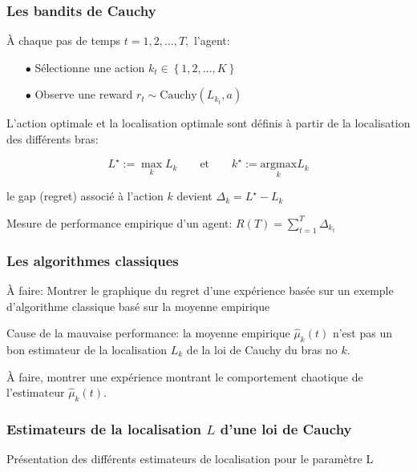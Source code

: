 \documentclass[8pt, sans]{beamer}
\begin{document}
\begin{frame}

\frametitle{Les bandits de Cauchy}

À chaque pas de temps $t=1,2,\ldots,T,$ l'agent:

\begin{itemize}

\item[$\bullet$] Sélectionne une action $k_t\in\left\{1,2,\ldots,K\right\}$

\item[$\bullet$] Observe une reward $r_t\sim \mathrm{Cauchy}(L_{k_t},a)$

\end{itemize}

\vfill
\pause

L'action optimale et la localisation optimale sont définis à partir de la localisation des différents bras:

\pause
$$\displaystyle L^{\star} := \max_k L_k \qquad \text{et} \qquad k^{\star} := \underset{k}{\mathrm{argmax}} L_k$$ 

\pause
\vfill

le gap (regret) associé à l'action $k$ devient $\Delta_k= L^{\star}-L_k$ 

\pause
\vfill

Mesure de performance empirique d'un agent: $\displaystyle R(T)=\sum_{t=1}^T \Delta_{k_t}$

\end{frame}

\begin{frame}
\frametitle{Les algorithmes classiques}

À faire: Montrer le graphique du regret d'une expérience basée sur un exemple d'algorithme classique basé sur la moyenne empirique 
\vfill
\pause

Cause de la mauvaise performance: la moyenne empirique $\hat \mu_k(t)$ n'est pas un bon estimateur de la localisation $L_k$ de la loi de Cauchy du bras no $k.$\\

\vfill
\pause

À faire, montrer une expérience montrant le comportement chaotique de l'estimateur $\hat \mu_{k}(t).$ 
\vfill

\end{frame}

\begin{frame}
\frametitle{Estimateurs de la localisation $L$ d'une loi de Cauchy}
Présentation des différents estimateurs de localisation pour le paramètre L

\end{frame}
\end{document}
